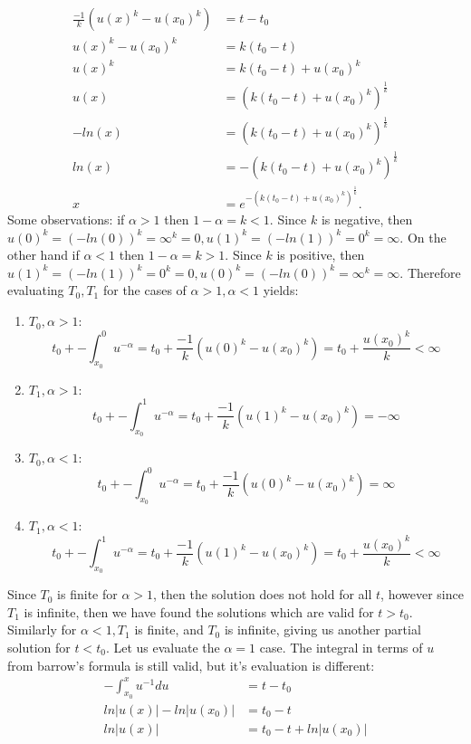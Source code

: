 \documentclass[12pt, letterpaper]{article}
\begin{document}
\begin{enumerate}
\begin{enumerate}
			\begin{align*}
				\frac{-1}{k}(u(x)^{k}-u(x_0)^{k}) &= t - t_0\\
				u(x)^{k}-u(x_0)^{k} &= k(t_0-t)\\
				u(x)^k &= k(t_0-t) + u(x_0)^{k}\\
				u(x) &= (k(t_0-t) + u(x_0)^{k})^\frac{1}{k}\\
				-ln(x) &= (k(t_0-t) + u(x_0)^{k})^\frac{1}{k}\\
				ln(x) &= -(k(t_0-t) + u(x_0)^{k})^\frac{1}{k}\\
				x &= e^{-(k(t_0-t) + u(x_0)^{k})^\frac{1}{k}}.
			\end{align*}
			Some observations:  if $\alpha > 1$ then $1-\alpha = k < 1$.  Since $k$ is negative, then $u(0)^k = (-ln(0))^k = \infty^k = 0, u(1)^k = (-ln(1))^k = 0^k = \infty$.  On the other hand if $\alpha < 1$ then $1-\alpha = k > 1$.  Since $k$ is positive, then $u(1)^k = (-ln(1))^k = 0^k = 0, u(0)^k = (-ln(0))^k = \infty^k = \infty$.  Therefore evaluating $T_0, T_1$ for the cases of $\alpha >1, \alpha < 1$ yields:
			\begin{enumerate}
				\item $T_0, \alpha > 1$: $$t_0 + -\int_{x_0}^0 u^{-\alpha} = t_0 + \frac{-1}{k}(u(0)^{k}-u(x_0)^{k}) = t_0 + \frac{u(x_0)^{k}}{k} < \infty$$
				\item $T_1, \alpha > 1$: $$t_0 + -\int_{x_0}^1 u^{-\alpha} = t_0 + \frac{-1}{k}(u(1)^{k}-u(x_0)^{k}) =  -\infty$$
				\item $T_0, \alpha < 1$: $$t_0 + -\int_{x_0}^0 u^{-\alpha} = t_0 + \frac{-1}{k}(u(0)^{k}-u(x_0)^{k}) =  \infty$$
				\item $T_1, \alpha < 1$: $$t_0 + -\int_{x_0}^1 u^{-\alpha} = t_0 + \frac{-1}{k}(u(1)^{k}-u(x_0)^{k}) = t_0 + \frac{u(x_0)^{k}}{k} < \infty$$
\end{enumerate}			 
			Since $T_0$ is finite for $\alpha > 1$, then the solution does not hold for all $t$, however since $T_1$ is infinite, then we have found the solutions which are valid for $t>t_0$.  Similarly for $\alpha < 1, T_1$ is finite, and $T_0$ is infinite, giving us another partial solution for $t < t_0$. Let us evaluate the $\alpha = 1$ case.  The integral in terms of $u$ from barrow's formula is still valid, but it's evaluation is different:
			\begin{align*}
				-\int_{x_0}^x u^{-1}du &= t-t_0\\
				ln|u(x)| - ln|u(x_0)| &= t_0-t\\
				ln|u(x)| & = t_0 -t + ln|u(x_0)|\\

\end{align*}
\end{enumerate}
\end{enumerate}
\end{document}
